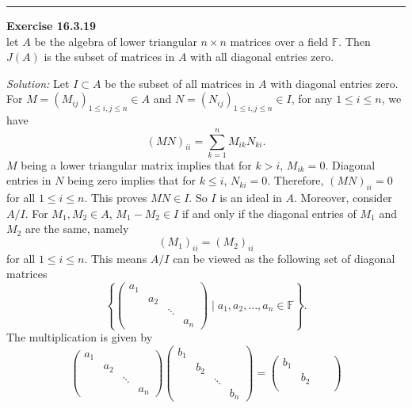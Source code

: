 \documentclass[a4paper, 12pt]{article}
\newenvironment{problem}[2][Exercise]
    { \begin{mdframed}[backgroundcolor=gray!20] \textbf{#1 #2} \\}
    {  \end{mdframed}}
\newenvironment{solution}
    {\textit{Solution:}}
    {}
\begin{document}
\noindent\rule{7in}{2.8pt}
\begin{problem}{16.3.19}
let \(A\) be the algebra of lower triangular \(n\times n\) matrices over a field \(\mathbb{F}\). Then \(J(A)\) is the subset of matrices in \(A\) with all diagonal 
entries zero.
\end{problem}
\begin{solution}
Let \(I\subset A\) be the subset of all matrices in \(A\) with  diagonal entries zero. For \(M=(M_{ij})_{1\leq i,j\leq n}\in A\) and \(N=(N_{ij})_{1\leq i,j\leq n}\in I\), for any \(1\leq i\leq n\), we have 
\[(MN)_{ii}=\sum_{k=1}^{n}M_{ik}N_{ki}.\]
\(M\) being a lower triangular matrix implies that for \(k> i\), \(M_{ik}=0\). Diagonal entries in \(N\) being zero implies that for \(k\leq i\), \(N_{ki}=0\). Therefore, \((MN)_{ii}=0\) for all \(1\leq i\leq n\). This proves \(MN\in I\). So 
\(I\) is an ideal in \(A\). Moreover, consider \(A/I\). For \(M_1,M_2\in A\), \(M_1-M_2\in I\) if and only if the diagonal entries of \(M_1\) and \(M_2\) are the same, namely 
\[(M_1)_{ii}=(M_2)_{ii}\]
for all \(1\leq i\leq n\). This means \(A/I\) can be viewed as the following set of diagonal matrices
\[\left\{ \begin{pmatrix}
    a_1& & &  \\ 
    &a_2& &  \\ 
    & & \ddots &  \\ 
    & & & a_n
\end{pmatrix}\mid a_1,a_2,\ldots,a_n\in \mathbb{F}\right\}.\]
The multiplication is given by 
\[\begin{pmatrix}
    a_1& & &  \\ 
    &a_2& &  \\ 
    & & \ddots &  \\ 
    & & & a_n
\end{pmatrix}\begin{pmatrix}
    b_1& & &  \\ 
    &b_2& &  \\ 
    & & \ddots &  \\ 
    & & & b_n
\end{pmatrix}=\begin{pmatrix}
    b_1& & &  \\ 
    &b_2& &  \\ 

\end{pmatrix}\]
\end{solution}
\end{document}
